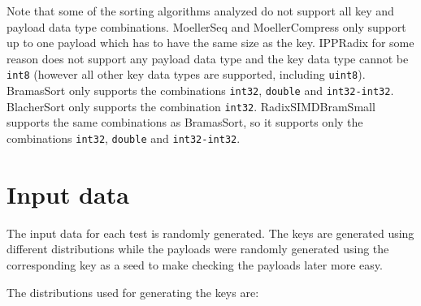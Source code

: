\documentclass[12pt, a4paper, openright, twoside]{tiarbeit}
\begin{document}
Note that some of the sorting algorithms analyzed do not support
all key and payload data type combinations. MoellerSeq and MoellerCompress
only support up to one payload which has to have the same size as the key.
\mbox{IPPRadix} for some reason does not support any payload data type and the key data type
cannot be \texttt{int8} (however all other key data types are supported, including
\texttt{uint8}). BramasSort only supports the combinations
\texttt{int32}, \texttt{double} and \texttt{int32-int32}. BlacherSort
only supports the combination \texttt{int32}. RadixSIMDBramSmall
supports the same combinations as BramasSort, so it supports only the combinations
\texttt{int32}, \texttt{double} and \texttt{int32-int32}.

\section{Input data}
\label{sec:input-data}

The input data for each test is randomly generated. The keys are generated
using different distributions while the payloads were randomly generated
using the corresponding key as a seed to make checking the payloads later more
easy.

The distributions used for generating the keys are:
\end{document}
